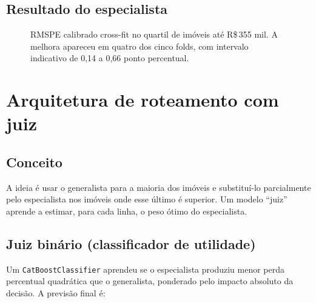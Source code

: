 \documentclass[12pt,a4paper]{article}
\begin{document}
\subsection{Resultado do especialista}

\begin{figure}[h]
\centering
{}
\caption{RMSPE calibrado cross-fit no quartil de imóveis até R\$\,355 mil. A melhora apareceu em quatro dos cinco folds, com intervalo indicativo de 0,14 a 0,66 ponto percentual.}
\label{fig:especialista}
\end{figure}

\section{Arquitetura de roteamento com juiz}

\subsection{Conceito}

A ideia é usar o generalista para a maioria dos imóveis e substituí-lo parcialmente pelo especialista nos imóveis onde esse último é superior. Um modelo ``juiz'' aprende a estimar, para cada linha, o peso ótimo do especialista.

\subsection{Juiz binário (classificador de utilidade)}

Um \lstinline{CatBoostClassifier} aprendeu se o especialista produziu menor perda percentual quadrática que o generalista, ponderado pelo impacto absoluto da decisão. A previsão final é:
\end{document}
